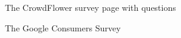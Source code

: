 \documentclass[twoside,letterpaper]{soups}
\begin{document}
\begin{figure}
\centering
{}
\caption{The CrowdFlower survey page with questions}
\label{fig:survey_sample}
\end{figure}

\begin{figure}
\centering
{}
\caption{The Google Consumers Survey}
\label{fig:survey_google}
\end{figure}
\end{document}
